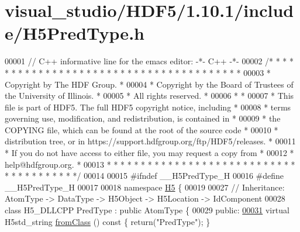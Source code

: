 \hypertarget{visual__studio_2_h_d_f5_21_810_81_2include_2_h5_pred_type_8h_source}{}\section{visual\+\_\+studio/\+H\+D\+F5/1.10.1/include/\+H5\+Pred\+Type.h}
\label{visual__studio_2_h_d_f5_21_810_81_2include_2_h5_pred_type_8h_source}

\begin{DoxyCode}
00001 \textcolor{comment}{// C++ informative line for the emacs editor: -*- C++ -*-}
00002 \textcolor{comment}{/* * * * * * * * * * * * * * * * * * * * * * * * * * * * * * * * * * * * * * *}
00003 \textcolor{comment}{ * Copyright by The HDF Group.                                               *}
00004 \textcolor{comment}{ * Copyright by the Board of Trustees of the University of Illinois.         *}
00005 \textcolor{comment}{ * All rights reserved.                                                      *}
00006 \textcolor{comment}{ *                                                                           *}
00007 \textcolor{comment}{ * This file is part of HDF5.  The full HDF5 copyright notice, including     *}
00008 \textcolor{comment}{ * terms governing use, modification, and redistribution, is contained in    *}
00009 \textcolor{comment}{ * the COPYING file, which can be found at the root of the source code       *}
00010 \textcolor{comment}{ * distribution tree, or in https://support.hdfgroup.org/ftp/HDF5/releases.  *}
00011 \textcolor{comment}{ * If you do not have access to either file, you may request a copy from     *}
00012 \textcolor{comment}{ * help@hdfgroup.org.                                                        *}
00013 \textcolor{comment}{ * * * * * * * * * * * * * * * * * * * * * * * * * * * * * * * * * * * * * * */}
00014 
00015 \textcolor{preprocessor}{#ifndef \_\_H5PredType\_H}
00016 \textcolor{preprocessor}{#define \_\_H5PredType\_H}
00017 
00018 \textcolor{keyword}{namespace }\hyperlink{namespace_h5}{H5} \{
00019 
00027 \textcolor{comment}{//  Inheritance: AtomType -> DataType -> H5Object -> H5Location -> IdComponent}
00028 \textcolor{keyword}{class }H5\_DLLCPP PredType : \textcolor{keyword}{public} AtomType \{
00029    \textcolor{keyword}{public}:
\hyperlink{class_h5_1_1_pred_type_a75af31606c502672b4c55947f11a9632}{00031}         \textcolor{keyword}{virtual} H5std\_string \hyperlink{class_h5_1_1_pred_type_a75af31606c502672b4c55947f11a9632}{fromClass} ()\textcolor{keyword}{ const }\{ \textcolor{keywordflow}{return}(\textcolor{stringliteral}{"PredType"}); \}

\end{DoxyCode}
